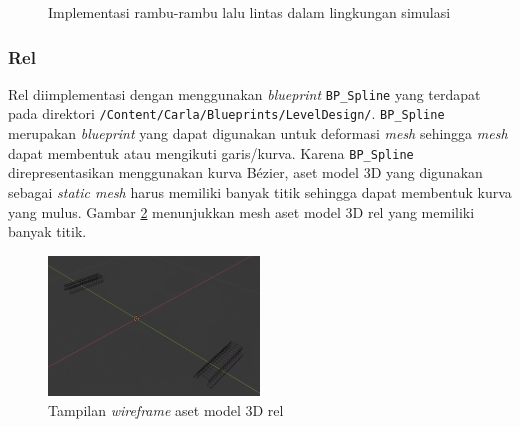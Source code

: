 \begin{figure}[!h]
    \centering
    \hfill
    \caption{Implementasi rambu-rambu lalu lintas dalam lingkungan simulasi}
    \label{fig:road-signs}
\end{figure}

\subsubsection{Rel}

Rel diimplementasi dengan menggunakan \textit{blueprint} \verb|BP_Spline| yang
terdapat pada direktori \verb|/Content/Carla/Blueprints/LevelDesign/|.
\verb|BP_Spline| merupakan \textit{blueprint} yang dapat digunakan untuk
deformasi \textit{mesh} sehingga \textit{mesh} dapat membentuk atau mengikuti
garis/kurva. Karena \verb|BP_Spline| direpresentasikan menggunakan kurva Bézier,
aset model 3D yang digunakan sebagai \textit{static mesh} harus memiliki banyak
titik sehingga dapat membentuk kurva yang mulus. Gambar \ref{fig:rel-mesh}
menunjukkan mesh aset model 3D rel yang memiliki banyak titik.

\begin{figure}[!h]
    \centering
    \includegraphics[width=0.5\textwidth]{resources/chapter-4/rel-mesh.png}
    \caption{Tampilan \textit{wireframe} aset model 3D rel}
    \label{fig:rel-mesh}
\end{figure}

